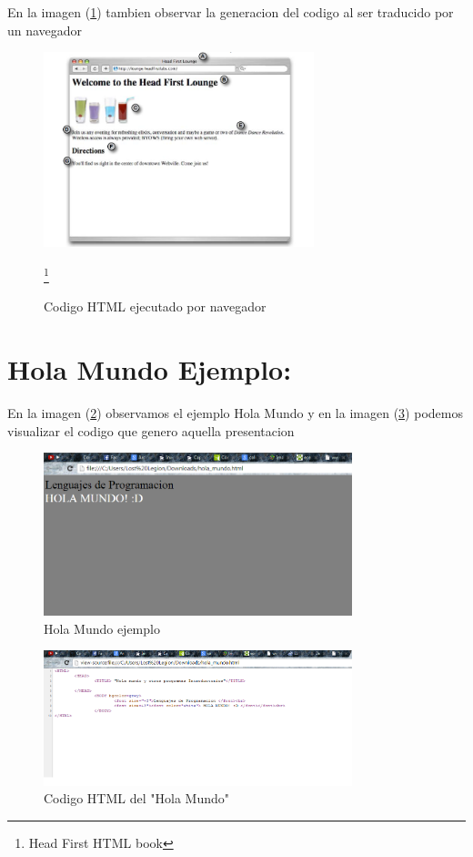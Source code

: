 \documentclass[11pt]{article} %
\begin{document}
\singlespace

\begin{center}
En la imagen (\ref{fig:5.2}) tambien observar la generacion del codigo al ser traducido por un navegador
\end{center}

\begin{figure}[htb]
\centering
\includegraphics[width=0.7\textwidth]{imagenes/img2.png}
\caption{Codigo HTML ejecutado por navegador}
\label{fig:5.2}
\footnote{Head First HTML book}
\end{figure}


\section{Hola Mundo Ejemplo:}

\begin{center}
En la imagen (\ref{fig:6.1}) observamos el ejemplo Hola Mundo y en la imagen  (\ref{fig:6.2}) podemos visualizar el codigo que genero aquella presentacion
\end{center}


\begin{figure}[htb]
\centering
\includegraphics[width=0.8\textwidth]{imagenes/Hola_Mundo.png}
\caption{Hola Mundo ejemplo}
\label{fig:6.1}
\end{figure}


\begin{center}

\end{center}

\begin{figure}[htb]
\centering
\includegraphics[width=0.8\textwidth]{imagenes/Hola_MundoCod.png}
\caption{Codigo HTML del "Hola Mundo"}
\label{fig:6.2}
\end{figure}
\end{document}
